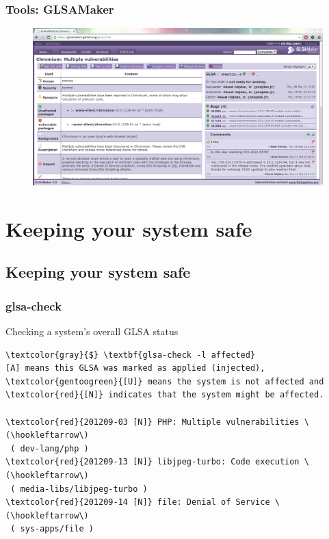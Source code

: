 \documentclass[svgnames]{beamer}
\newenvironment{changemargin}[2]{%
  \begin{list}{}{%
    \setlength{\topsep}{0pt}%
    \setlength{\leftmargin}{#1}%
    \setlength{\rightmargin}{#2}%
    \setlength{\listparindent}{\parindent}%
    \setlength{\itemindent}{\parindent}%
    \setlength{\parsep}{\parskip}%
  }%
  \item[]}{\end{list}}
\begin{document}
\begin{frame}
  \frametitle{Tools: GLSAMaker}
  \begin{changemargin}{-1cm}{-1cm}
    \begin{figure}
      \includegraphics[width=0.9\paperwidth]{img/glsamaker.png}   
    \end{figure}
  \end{changemargin}
\end{frame}


\section{Keeping your system safe}
\subsection*{Keeping your system safe}

\begin{frame}[fragile]
  \frametitle{glsa-check}
  
  \begin{block}{Checking a system's overall GLSA status}
    \begin{Verbatim}[commandchars=\\\{\}]
\textcolor{gray}{$} \textbf{glsa-check -l affected}
[A] means this GLSA was marked as applied (injected),
\textcolor{gentoogreen}{[U]} means the system is not affected and
\textcolor{red}{[N]} indicates that the system might be affected.

\textcolor{red}{201209-03 [N]} PHP: Multiple vulnerabilities \(\hookleftarrow\)
 ( dev-lang/php )
\textcolor{red}{201209-13 [N]} libjpeg-turbo: Code execution \(\hookleftarrow\)
 ( media-libs/libjpeg-turbo )
\textcolor{red}{201209-14 [N]} file: Denial of Service \(\hookleftarrow\) 
 ( sys-apps/file )
    \end{Verbatim}
  \end{block}
\end{frame}
\end{document}
